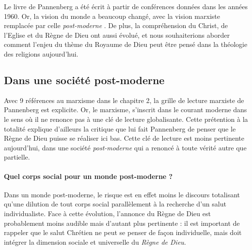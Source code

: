 Le livre de Pannenberg a été écrit à partir de conférences données dans les années 1960. Or, la vision du monde a beaucoup changé, avec la vision marxiste remplacée par celle  \textit{post-moderne} . De plus, la compréhension du Christ, de l'Eglise et du Règne de Dieu ont aussi évolué, et nous souhaiterions aborder comment l’enjeu du thème du Royaume de Dieu peut être pensé dans la théologie des religions aujourd'hui.

\subsection{Dans une société post-moderne}

Avec 9 références au marxisme dans le chapitre 2, la grille de lecture marxiste de Pannenberg est explicite. Or, le marxisme, s'inscrit dans le courant moderne dans le sens où il ne renonce pas à une clé de lecture globalisante. Cette prétention à la totalité explique d'ailleurs la critique que lui fait Pannenberg de penser que le Règne de Dieu puisse se réaliser ici bas. Cette clé de lecture est moins pertinente aujourd'hui, dans une société \textit{post-moderne} qui a renoncé à toute vérité autre que partielle.


\paragraph{ Quel corps social pour un monde post-moderne ?} Dans un monde post-moderne, le risque est en effet moins le discours totalisant qu'une dilution de tout corps social parallèlement à la recherche d'un salut individualiste. Face à cette évolution, l'annonce du Règne de Dieu est probablement moins audible mais d'autant plus pertinente : il est important de rappeler que le salut Chrétien ne peut se penser de façon individuelle, mais doit intégrer la dimension sociale et universelle du \textit{Règne de Dieu}.


